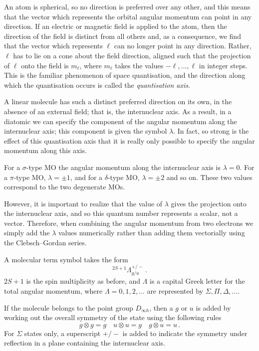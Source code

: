 \documentclass{article}
\theoremstyle{plain}\theoremheaderfont{\normalfont\itshape}\theorembodyfont{\rmfamily}\theoremseparator{.}\newtheorem*{rem}{Remark}\newtheorem*{ex}{Example}\newtheorem*{proof}{Proof}\newtheorem*{altp}{Alternative proof}
\theoremstyle{plain}\theoremheaderfont{\normalfont\bfseries}\theorembodyfont{\rmfamily}\theoremseparator{.}\newtheorem{thm}{Theorem}[section]\newtheorem{lem}[thm]{Lemma}\newtheorem{prop}[thm]{Proposition}\newtheorem*{cor}{Corollary}\newtheorem{defn}[thm]{Definition}\newtheorem{clm}[thm]{Claim}\newtheorem{clminproof}{Claim}\newtheorem{pos}{Postulate}[section]
\theoremstyle{break}\theoremheaderfont{\normalfont\itshape}\theorembodyfont{\rmfamily}\theoremseparator{.\medskip}\newtheorem*{proofskip}{Proof}\newtheorem*{exs}{Examples}\newtheorem*{rems}{Remarks}
\theoremstyle{break}\theoremheaderfont{\normalfont\bfseries}\theorembodyfont{\rmfamily}\theoremseparator{.\medskip}\newtheorem{lemskip}[thm]{Lemma}\newtheorem{defnskip}[thm]{Definition}\newtheorem{propskip}[thm]{Proposition}\newtheorem{thmskip}[thm]{Theorem}
\numberwithin{equation}{section}
\begin{document}
    An atom is spherical, so no direction is preferred over any other, and this means that the vector which represents the orbital angular momentum can point in any direction. If an electric or magnetic field is applied to the atom, then the direction of the field is distinct from all others and, as a consequence, we find that the vector which represents \(\ell\) can no longer point in any direction. Rather, \(\ell\) has to lie on a cone about the field direction, aligned such that the projection of \(\ell\) onto the field is \(m_\ell\), where \(m_\ell\) takes the values \(-\ell,\dots,\ell\) in integer steps.  This is the familiar phenomenon of space quantisation, and the direction along which the quantisation occurs is called the \textit{quantisation axis}.

    A linear molecule has such a distinct preferred direction on its own, in the absence of an external field; that is, the internuclear axis. As a result, in a diatomic we can specify the component of the angular momentum along the internuclear axis; this component is given the symbol \(\lambda\). In fact, so strong is the effect of this quantisation axis that it is really only possible to specify the angular momentum along this axis.
   
    For a \(\sigma\)-type MO the angular momentum along the internuclear axis is \(\lambda =0\). For a \(\pi\)-type MO, \(\lambda=\pm 1\), and for a \(\delta\)-type MO, \(\lambda=\pm 2\) and so on. These two values correspond to the two degenerate MOs.

    However, it is important to realize that the value of \(\lambda\) gives the projection onto the internuclear axis, and so this quantum number represents a scalar, not a vector. Therefore, when combining the angular momentum from two electrons we simply add the \(\lambda\) values numerically rather than adding them vectorially using the Clebsch--Gordan series.

    A molecular term symbol takes the form
    \begin{equation}
        ^{2S+1}\Lambda^{+/-}_{g/u}\,.
    \end{equation}
    \(2S+1\) is the spin multiplicity as before, and \(\Lambda\) is a capital Greek letter for the total angular momentum, where \(\Lambda=0,1,2,\dots\) are represented by \(\Sigma,\Pi,\Delta,\dots\).

    If the molecule belongs to the point group \(D_{\infty h}\), then a \(g\) or \(u\) is added by working out the overall symmetry of the state using the following rules
    \begin{equation}
        g\otimes g=g\quad u\otimes u=g\quad g\otimes u=u\,.
    \end{equation}
    For \(\Sigma\) states only, a superscript \(+/-\) is added to indicate the symmetry under reflection in a plane containing the internuclear axis.
\end{document}
